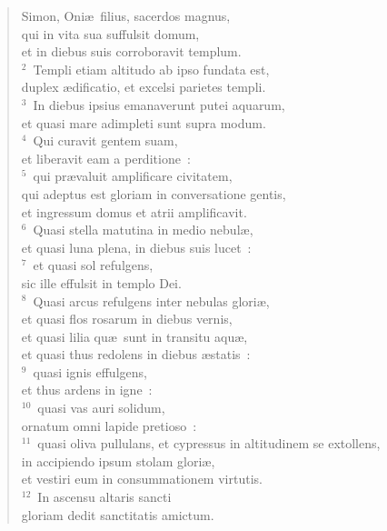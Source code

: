 \begin{flushleft}\begin{verse}\vspace{-19pt}\hspace{6pt}Simon, Oni\ae\ filius, sacerdos magnus,\\\hspace{6pt} qui in vita sua suffulsit domum,\\ et in diebus suis corroboravit templum.\\
${}^{2}$~Templi etiam altitudo ab ipso fundata est,\\ duplex \ae dificatio, et excelsi parietes templi.\\
${}^{3}$~In diebus ipsius emanaverunt putei aquarum,\\ et quasi mare adimpleti sunt supra modum.\\
${}^{4}$~Qui curavit gentem suam,\\ et liberavit eam a perditione~:\\
${}^{5}$~qui pr\ae valuit amplificare civitatem,\\ qui adeptus est gloriam in conversatione gentis,\\ et ingressum domus et atrii amplificavit.\\
${}^{6}$~Quasi stella matutina in medio nebul\ae ,\\ et quasi luna plena, in diebus suis lucet~:\\
${}^{7}$~et quasi sol refulgens,\\ sic ille effulsit in templo Dei.\\
${}^{8}$~Quasi arcus refulgens inter nebulas glori\ae ,\\ et quasi flos rosarum in diebus vernis,\\ et quasi lilia qu\ae\ sunt in transitu aqu\ae ,\\ et quasi thus redolens in diebus \ae statis~:\\
${}^{9}$~quasi ignis effulgens,\\ et thus ardens in igne~:\\
${}^{10}$~quasi vas auri solidum,\\ ornatum omni lapide pretioso~:\\
${}^{11}$~quasi oliva pullulans, et cypressus in altitudinem se extollens,\\ in accipiendo ipsum stolam glori\ae ,\\ et vestiri eum in consummationem virtutis.\\
${}^{12}$~In ascensu altaris sancti\\ gloriam dedit sanctitatis amictum.\\

\end{verse}
\end{flushleft}
